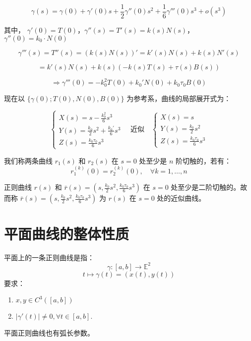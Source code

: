 \documentclass[lang=cn,10pt,thmcnt=section]{elegantbook}
\begin{document}
$$
\gamma(s) = \gamma(0) + \gamma'(0)s + \frac{1}{2}\gamma''(0)s^2 + \frac{1}{6}\gamma'''(0)s^3 + o(s^3)
$$

其中，
\(\gamma'(0) = T(0)\)，\(\gamma''(s) = T'(s) = k(s)N(s)\)，\(\gamma''(0) = k_0 \cdot N(0)\)

$$
\gamma'''(s) = T''(s) = \left( k(s)N(s) \right)' = k'(s)N(s) + k(s)N'(s)
$$

$$
= k'(s)N(s) + k(s)\left( -k(s)T(s) + \tau(s)B(s) \right)
$$

$$
\Rightarrow \gamma'''(0) = -k_0^2 T(0) + k_0' N(0) + k_0 \tau_0 B(0)
$$

现在以 \(\{ \gamma(0); T(0), N(0), B(0) \}\) 为参考系，曲线的局部展开式为：

$$
\begin{cases}
X(s) = s - \frac{k_0^2}{6} s^3 \\
Y(s) = \frac{k_0}{2} s^2 + \frac{k_0'}{6} s^3 \\
Z(s) = \frac{k_0 \tau_0}{6} s^3
\end{cases}
\quad \text{近似} \quad
\begin{cases}
X(s) = s \\
Y(s) = \frac{k_0}{2} s^2 \\
Z(s) = \frac{k_0 \tau_0}{6} s^3
\end{cases}
$$
\begin{definition}
    我们称两条曲线 \(r_1(s)\) 和 \(r_2(s)\) 在 \(s=0\) 处至少是 \(n\) 阶切触的，若有：
$$
r_1^{(k)}(0) = r_2^{(k)}(0), \quad \forall k=1,\ldots,n
$$
\end{definition}
\begin{corollary}
    正则曲线 \(r(s)\) 和 \(\bar{r}(s) = \left( s, \frac{k_0}{2} s^2, \frac{k_0 \tau_0}{6} s^3 \right)\) 在 \(s=0\) 处至少是二阶切触的。故而称 \(\bar{r}(s) = \left( s, \frac{k_0}{2} s^2, \frac{k_0 \tau_0}{6} s^3 \right)\) 为 \(r(s)\) 在 \(s=0\) 处的近似曲线。
\end{corollary}

\section{平面曲线的整体性质}

\begin{definition}\label{def:curve}
    平面上的一条正则曲线是指：
    \[
    \gamma : [a, b] \rightarrow \mathbb{E}^2
    \]
    \[
    t \mapsto \gamma(t) = (x(t), y(t))
    \]
    要求：
    \begin{enumerate}
        \item $x, y \in C^3([a, b])$
        \item $|\gamma'(t)| \neq 0, \forall t \in [a, b]$.
    \end{enumerate}
    \begin{remark}
        平面正则曲线也有弧长参数。
    \end{remark}
    \end{definition}
    
\end{document}
